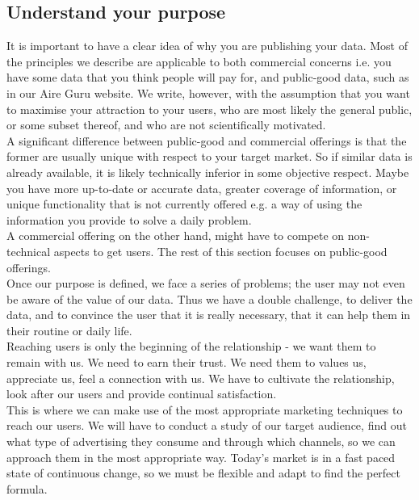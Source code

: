 \subsection{Understand your purpose}

It is important to have a clear idea of why you are publishing your data. Most of the principles
we describe are applicable to both commercial concerns i.e. you have some data that you think
people will pay for, and public-good data, such as in our Aire Guru website. We write, however,
with the assumption that you want to maximise your attraction to your users, who are most likely
the general public, or some subset thereof, and who are not scientifically motivated.\\

A significant difference between public-good and commercial offerings is that the former are usually
unique with respect to your target market. So if similar data is already available, it is likely technically
inferior in some objective respect. Maybe you have more up-to-date or accurate data,
greater coverage of information, or unique functionality that is not currently offered e.g. a way of using the
information you provide to solve a daily problem.\\

A commercial offering on the other hand, might have to compete on
non-technical aspects to get users. The rest of this section focuses on public-good offerings. \\

Once our purpose is defined, we face a series of problems; the user may not even be aware of the value of our data.
Thus we have a double challenge, to deliver the data, and to convince the user that it is really necessary, that it can help them in their routine or daily life.\\

Reaching users is only the beginning of the relationship - we want them to remain with us.
We need to earn their trust. We need them to values us, appreciate us, feel a connection with us.
We have to cultivate the relationship, look after our users and provide continual satisfaction.\\

This is where we can make use of the most appropriate marketing techniques to reach our users.
We will have to conduct a study of our target audience, find out what type of advertising they consume and through which channels,
so we can approach them in the most appropriate way. Today's market is in a fast paced state of continuous change,
so we must be flexible and adapt to find the perfect formula. \\

